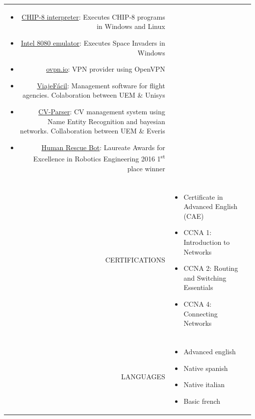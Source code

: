 \documentclass[a4paper, 11pt]{article}
\begin{document}
\begin{longtable}{rp{11cm}}
\begin{itemize}[leftmargin=0cm,label={}]
            \item \href{https://github.com/hugo19941994/CHIP8-Emu}{CHIP-8 interpreter}: Executes CHIP-8 programs in Windows and Linux
            \item \href{https://github.com/hugo19941994/SpaceInvaders-Emu}{Intel 8080 emulator}: Executes Space Invaders in Windows
            \item \href{https://ovpn.io}{ovpn.io}: VPN provider using OpenVPN
            \item \href{https://github.com/hugo19941994/ViajeFacil}{ViajeFácil}: Management software for flight agencies. Colaboration between UEM \& Unisys
            \item \href{https://github.com/hugo19941994/CV-Parser}{CV-Parser}: CV management system using Name Entity Recognition and bayesian networks. Collaboration between UEM \& Everis
            \item \href{https://github.com/hugo19941994/robot}{Human Rescue Bot}: Laureate Awards for Excellence in Robotics Engineering 2016 1\textsuperscript{st} place winner
        \end{itemize}\\
        \\
        CERTIFICATIONS
        & \vspace{-8mm}
        \begin{itemize}[leftmargin=0cm,label={},noitemsep]
            \item Certificate in Advanced English (CAE)
            \item CCNA 1: Introduction to Networks
            \item CCNA 2: Routing and Switching Essentials
            \item CCNA 4: Connecting Networks
        \end{itemize}\\
        \\
        LANGUAGES
        & \vspace{-8mm}
        \begin{itemize}[leftmargin=0cm,label={},noitemsep]
            \item Advanced english
            \item Native spanish
            \item Native italian
            \item Basic french
        \end{itemize}
    \end{longtable}
\end{document}
